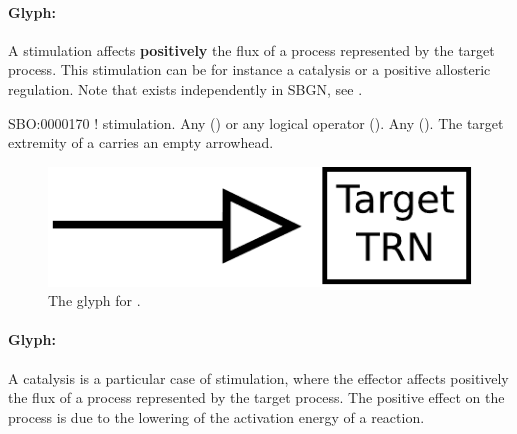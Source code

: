 
\paragraph{Glyph: }\label{sec:stimulation}

A stimulation affects \textbf{positively} the flux of a process represented by the target process. This stimulation can be for instance a catalysis or a positive allosteric regulation. Note that  exists independently in SBGN, see .

\begin{glyphDescription}
 \glyphSboTerm SBO:0000170 ! stimulation.
 \glyphOrigin Any  () or any logical operator ().
 \glyphTarget Any  ().
 \glyphEndPoint The target extremity of a  carries an empty arrowhead.
 \end{glyphDescription}

\begin{figure}[H]
  \centering
  \includegraphics[scale = 0.5]{images/stimulation}
  \caption{The \PD glyph for .}
  \label{fig:stimulation}
\end{figure}




\paragraph{Glyph: }\label{sec:catalysis}

A catalysis is a particular case of stimulation, where the effector affects
positively the flux of a process represented by the target process. The positive effect on the process is due to the lowering of the activation energy of a reaction.

